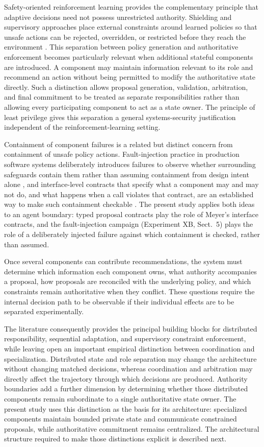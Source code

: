 \documentclass[runningheads]{llncs}
\begin{document}
Safety-oriented reinforcement learning provides the complementary principle that adaptive decisions need not possess unrestricted authority. Shielding and supervisory approaches place external constraints around learned policies so that unsafe actions can be rejected, overridden, or restricted before they reach the environment \cite{alshiekh2018,garcia2015}. This separation between policy generation and authoritative enforcement becomes particularly relevant when additional stateful components are introduced. A component may maintain information relevant to its role and recommend an action without being permitted to modify the authoritative state directly. Such a distinction allows proposal generation, validation, arbitration, and final commitment to be treated as separate responsibilities rather than allowing every participating component to act as a state owner. The principle of least privilege \cite{saltzer1975} gives this separation a general systems-security justification independent of the reinforcement-learning setting.

Containment of component failures is a related but distinct concern from containment of unsafe policy actions. Fault-injection practice in production software systems deliberately introduces failures to observe whether surrounding safeguards contain them rather than assuming containment from design intent alone \cite{basiri2016}, and interface-level contracts that specify what a component may and may not do, and what happens when a call violates that contract, are an established way to make such containment checkable \cite{meyer1992}. The present study applies both ideas to an agent boundary: typed proposal contracts play the role of Meyer's interface contracts, and the fault-injection campaign (Experiment XB, Sect.~5) plays the role of a deliberately injected failure against which containment is checked, rather than assumed.

Once several components can contribute recommendations, the system must determine which information each component owns, what authority accompanies a proposal, how proposals are reconciled with the underlying policy, and which constraints remain authoritative when they conflict. These questions require the internal decision path to be observable if their individual effects are to be separated experimentally.

The literature consequently provides the principal building blocks for distributed responsibility, sequential adaptation, and supervisory constraint enforcement, while leaving open an important empirical distinction between coordination and specialization. Distributed state and role separation may change the architecture without changing matched decisions, whereas coordination and arbitration may directly affect the trajectory through which decisions are produced. Authority boundaries add a further dimension by determining whether those distributed components remain subordinate to a single authoritative state owner. The present study uses this distinction as the basis for its architecture: specialized components maintain bounded private state and communicate constrained proposals, while authoritative commitment remains centralized. The architectural structure required to make those distinctions explicit is described next.
\end{document}
